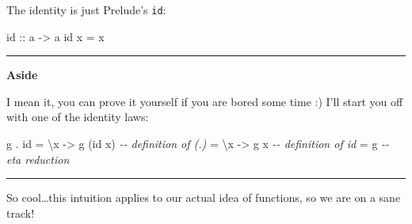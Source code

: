 \documentclass[]{article}
\newenvironment{Shaded}{}{}
\newcommand{\CommentTok}[1]{\textcolor[rgb]{0.38,0.63,0.69}{\textit{#1}}}
\newcommand{\DecValTok}[1]{\textcolor[rgb]{0.25,0.63,0.44}{#1}}
\newcommand{\FunctionTok}[1]{\textcolor[rgb]{0.02,0.16,0.49}{#1}}
\newcommand{\NormalTok}[1]{#1}
\newcommand{\OperatorTok}[1]{\textcolor[rgb]{0.40,0.40,0.40}{#1}}
\newcommand{\OtherTok}[1]{\textcolor[rgb]{0.00,0.44,0.13}{#1}}
\begin{document}
The identity is just Prelude's \texttt{id}:

\begin{Shaded}
\begin{Highlighting}[]
\FunctionTok{id}\OtherTok{ ::}\NormalTok{ a }\OtherTok{{-}\textgreater{}}\NormalTok{ a}
\FunctionTok{id}\NormalTok{ x }\OtherTok{=}\NormalTok{ x}
\end{Highlighting}
\end{Shaded}

\begin{Shaded}
\end{Shaded}

\begin{center}\rule{0.5\linewidth}{0.5pt}\end{center}

\textbf{Aside}

I mean it, you can prove it yourself if you are bored some time :) I'll start
you off with one of the identity laws:

\begin{Shaded}
\begin{Highlighting}[]
\NormalTok{g }\OperatorTok{.} \FunctionTok{id} \OtherTok{=}\NormalTok{ \textbackslash{}x }\OtherTok{{-}\textgreater{}}\NormalTok{ g (}\FunctionTok{id}\NormalTok{ x)     }\CommentTok{{-}{-} definition of (.)}
       \OtherTok{=}\NormalTok{ \textbackslash{}x }\OtherTok{{-}\textgreater{}}\NormalTok{ g x          }\CommentTok{{-}{-} definition of id}
       \OtherTok{=}\NormalTok{ g                  }\CommentTok{{-}{-} eta reduction}
\end{Highlighting}
\end{Shaded}

\begin{center}\rule{0.5\linewidth}{0.5pt}\end{center}

So cool\ldots this intuition applies to our actual idea of functions, so we are
on a sane track!
\end{document}
